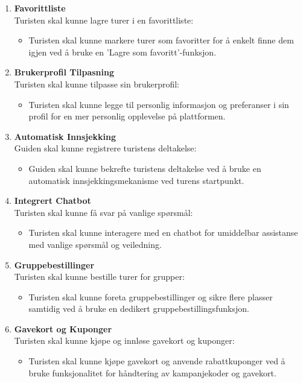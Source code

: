 \documentclass[../doc.tex]{subfiles}
\begin{document}
\begin{enumerate}
    \item \textbf{Favorittliste} \\
    Turisten skal kunne lagre turer i en favorittliste:
    \begin{itemize}
        \item Turisten skal kunne markere turer som favoritter for å enkelt finne dem igjen ved å bruke en 'Lagre som favoritt'-funksjon.
    \end{itemize}

    \item \textbf{Brukerprofil Tilpasning} \\
    Turisten skal kunne tilpasse sin brukerprofil:
    \begin{itemize}
        \item Turisten skal kunne legge til personlig informasjon og preferanser i sin profil for en mer personlig opplevelse på plattformen.
    \end{itemize}

    \item \textbf{Automatisk Innsjekking} \\
    Guiden skal kunne registrere turistens deltakelse:
    \begin{itemize}
        \item Guiden skal kunne bekrefte turistens deltakelse ved å bruke en automatisk innsjekkingsmekanisme ved turens startpunkt.
    \end{itemize}

    \item \textbf{Integrert Chatbot} \\
    Turisten skal kunne få svar på vanlige spørsmål:
    \begin{itemize}
        \item Turisten skal kunne interagere med en chatbot for umiddelbar assistanse med vanlige spørsmål og veiledning.
    \end{itemize}

    \item \textbf{Gruppebestillinger} \\
    Turisten skal kunne bestille turer for grupper:
    \begin{itemize}
        \item Turisten skal kunne foreta gruppebestillinger og sikre flere plasser samtidig ved å bruke en dedikert gruppebestillingsfunksjon.
    \end{itemize}

    \item \textbf{Gavekort og Kuponger} \\
    Turisten skal kunne kjøpe og innløse gavekort og kuponger:
    \begin{itemize}
        \item Turisten skal kunne kjøpe gavekort og anvende rabattkuponger ved å bruke funksjonalitet for håndtering av kampanjekoder og gavekort.
    \end{itemize}


\end{enumerate}
\end{document}
